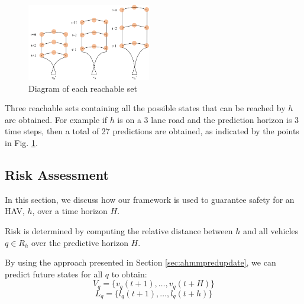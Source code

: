 \documentclass[letterpaper, 10 pt, conference]{ieeeconf}  %
\newcommand\NB[1]{$\spadesuit$\footnote{NB: #1}}
\newcommand\RP[1]{$\clubsuit$\footnote{RP: #1}}
\begin{document}
\begin{figure}[ht!]
    \includegraphics[width=0.48\textwidth]{fig/input.png}
    \caption{Diagram of each reachable set}
    \label{fig:reach}
\end{figure}
Three reachable sets containing all the possible states that can be reached by $h$ are obtained. For example if $h$ is on a 3 lane road and the prediction horizon is 3 time steps, then a total of 27 predictions are obtained, as indicated by the points in Fig. \ref{fig:reach}.

\subsection{Risk Assessment}

 In this section, we discuss how our framework is used to guarantee safety for an HAV, $h$, over a time horizon $H$.
 
 
 Risk is determined by computing the relative distance between $h$ and all vehicles $q\in R_h$ over the predictive horizon $H$.


By using the approach presented in Section \ref{sec:ahmmpredupdate}, we can predict future states for all $q$ to obtain:
\begin{equation}
    V_q = \{v_q(t+1),\ldots,v_q(t+H)\}
\end{equation}
\begin{equation}
    L_q = \{l_q(t+1),\ldots,l_q(t+h)\}
\end{equation}
\end{document}
